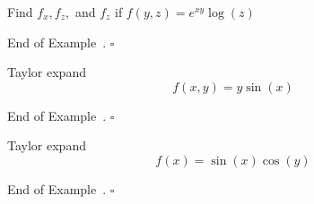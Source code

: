 \documentclass[10pt]{article}
\theoremstyle{definition}
\newtheorem{example}[theorem]{Example}
\renewenvironment{example}
{\begin{oldexample}}
  {\par\smallskip\hfill   End of Example~\theexample. $\square$    \par\end{oldexample}}
\newcommand{\1}[1]{\textbf{1}_{\left[#1\right]}} %
\begin{document}
\begin{example}
  Find $f_{x},f_{z},$ and $f_{z}$ if $f(y,z)= e^{xy}\log(z) $
\end{example}


\begin{example}
  Taylor expand
  \begin{equation*}
    f(x,y) = y\sin(x)
  \end{equation*}
\end{example}

\begin{example}
  Taylor expand
  \begin{equation*}
    f(x) = \sin(x)\cos(y)
  \end{equation*}
\end{example}
\end{document}
